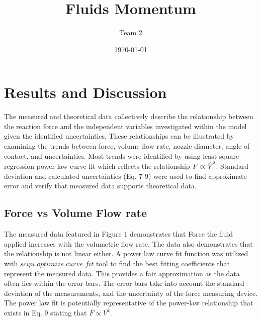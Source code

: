 \documentclass[11pt]{article}
\title{Fluids Momentum}
\author{Team 2} %
\date{\today} %
\newcommand{\vlm}{V \!\!\!\!\!\!\: \rule[0.07in]{.095in}{.0025in}}
\begin{document}
\maketitle
  

\setlength{\baselineskip}{22pt}
%


\section{Results and Discussion}
The measured and theoretical data collectively describe the relationship between the reaction force and the independent variables investigated within the model given the identified uncertainties. These relationships can be illustrated by examining the trends between force, volume flow rate, nozzle diameter, angle of contact, and uncertainties. Most trends were identified by using least square regression power law curve fit which reflects the relationship $F\propto \dot{\vlm}^2$. Standard deviation and calculated uncertainties (Eq. 7-9) were used to find approximate error and verify that measured data supports theoretical data.


\subsection{Force vs Volume Flow rate}
The measured data featured in Figure 1 demonstrates that Force the fluid applied increases with the volumetric flow rate. The data also demonstrates that the relationship is not linear either. A power law curve fit function was utilized  with $scipi.optimize.curve\_fit$ tool to find the best fitting coefficients that represent the measured data. This provides a fair approximation as the data often lies within the error bars. The error bars take into account the standard deviation of the measurements, and the uncertainty of the force measuring device. The power law fit is potentially representative of the power-law relationship that exists in Eq. 9 stating that $F\propto V^2$.
\end{document}
